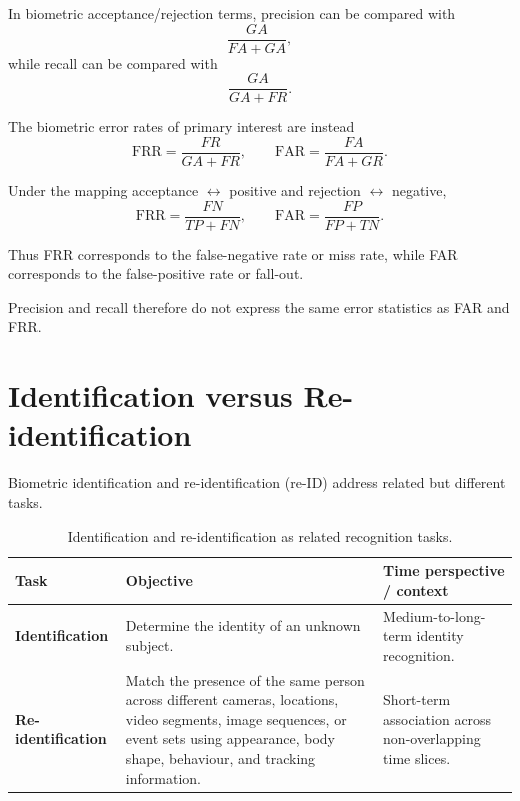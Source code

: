 \documentclass[11pt,a4paper,oneside]{report}
\begin{document}
In biometric acceptance/rejection terms,
precision can be compared with
\[
\frac{GA}{FA+GA},
\]
\nopagebreak
while recall can be compared with
\[
\frac{GA}{GA+FR}.
\]

The biometric error rates of primary interest are instead
\begin{equation}
\mathrm{FRR}
=
\frac{FR}{GA+FR},
\qquad
\mathrm{FAR}
=
\frac{FA}{FA+GR}.
\label{eq:biometric-error-counts}
\end{equation}

Under the mapping
acceptance
\(
\leftrightarrow
\)
positive
and rejection
\(
\leftrightarrow
\)
negative,
\begin{equation}
\mathrm{FRR}
=
\frac{FN}{TP+FN},
\qquad
\mathrm{FAR}
=
\frac{FP}{FP+TN}.
\label{eq:ml-mapping}
\end{equation}

Thus FRR corresponds to the false-negative rate or miss rate,
while FAR corresponds to the false-positive rate or fall-out.

Precision and recall therefore do not express the same error statistics
as FAR and FRR.

\Needspace{0.52\textheight}
\section{Identification versus Re-identification}
\label{subsec:reid}

Biometric identification and re-identification (re-ID) address related but different tasks.

\begin{table}[htbp]
\centering
\caption{Identification and re-identification as related recognition tasks.}
\label{tab:identification-reid}
\small

\begin{tabular}{
    >{\bfseries}P{3.0cm}
    P{6.2cm}
    P{4.8cm}
}
\toprule

Task &
\textbf{Objective} &
\textbf{Time perspective / context}
\\

\midrule

Identification &
Determine the identity of an unknown subject. &
Medium-to-long-term identity recognition.
\\

Re-identification &
Match the presence of the same person across different cameras,
locations, video segments, image sequences, or event sets using appearance,
body shape, behaviour, and tracking information. &
Short-term association across non-overlapping time slices.
\\

\bottomrule
\end{tabular}

\end{table}
\end{document}
